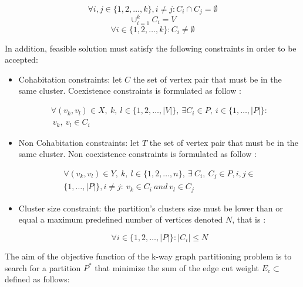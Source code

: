 \documentclass[review]{elsarticle}
\begin{document}
\begin{equation}
\forall i,j \in \{1,2,\ldots,k\},i\neq j : C_i\cap C_j= \emptyset
\end{equation}
\begin{equation}
\cup_{i=1}^k  C_i = V
\end{equation}
\begin{equation}
\forall i\in \{1,2,\ldots,k\} : C_i  \neq \emptyset
\end{equation}                                          

\noindent In addition, feasible solution must satisfy the following constraints in order to be accepted:

\begin{itemize}

	
	\item 	Cohabitation  constraints: let $C$ the set of vertex pair that must be in the same cluster.  Coexistence constraints is formulated as follow :
	
	\begin{equation}
	\begin{split}
	\forall (v_k,v_l )\in X, \ k, \ l \in \{1,2,\ldots,|V|\}, \  \exists C_i  \in P, \ i\in \{1,\ldots,|P|\}: \\
	\  v_k, \ v_l\in C_i   	
	\end{split}
	\end{equation}
	
	\item Non Cohabitation  constraints: let $T$ the set of vertex pair that must be in the same cluster. Non coexistence constraints is formulated as follow : 
	
	\begin{equation}
	\begin{split}
	\forall(v_k,v_l )\in Y, \ k, \ l\in \{1,2,\ldots,n\}, \ \exists \ C_i,\ C_j  \in P,
	i,j\in \\ \{1,\ldots,|P|\},  i\neq j : \ v_k \in C_i  \ and \  v_l \in C_j	         
	\end{split}
	\end{equation}
	
	\item Cluster size constraint: the partition's clusters size must be lower than or equal a maximum predefined number of vertices denoted $N$, that is :
	
	\begin{equation}
	\forall i\in \{1,2,\ldots,|P| \}: |C_i |\leq N                                                                            
	\end{equation}
	
\end{itemize} 
% 
The aim of the objective function of the k-way graph partitioning problem is to search for a partition $P^*$ that minimize the sum of the edge cut weight $E_c\subset $defined as follows:
\end{document}
